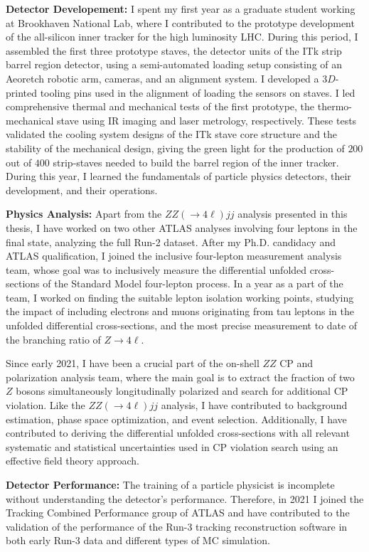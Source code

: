 \textbf{Detector Developement:}
I spent my first year as a graduate student working at Brookhaven National Lab, where I contributed to the prototype development of the all-silicon inner tracker for the high luminosity LHC. During this period, I assembled the first three prototype staves, the detector units of the ITk strip barrel region detector, using a semi-automated loading setup consisting of an Aeoretch robotic arm, cameras, and an alignment system. I developed a $3D$-printed tooling pins used in the alignment of loading the sensors on staves. I led comprehensive thermal and mechanical tests of the first prototype, the thermo-mechanical stave using IR imaging and laser metrology, respectively. These tests validated the cooling system designs of the ITk stave core structure and the stability of the mechanical design, giving the green light for the production of $200$ out of $400$ strip-staves needed to build the barrel region of the inner tracker. During this year, I learned the fundamentals of particle physics detectors, their development, and their operations.  

\textbf{Physics Analysis:}
Apart from the $ZZ(\rightarrow 4\ell)jj$ analysis presented in this thesis, I have worked on two other ATLAS analyses involving four leptons in the final state, analyzing the full Run-2 dataset. After my Ph.D. candidacy and ATLAS qualification, I joined the inclusive four-lepton measurement analysis team, whose goal was to inclusively measure the differential unfolded cross-sections of the Standard Model four-lepton process. In a year as a part of the team, I worked on finding the suitable lepton isolation working points, studying the impact of including electrons and muons originating from tau leptons in the unfolded differential cross-sections, and the most precise measurement to date of the branching ratio of $ Z \to 4\ell$.

Since early 2021, I have been a crucial part of the on-shell $ZZ$ CP and polarization analysis team, where the main goal is to extract the fraction of two $Z$ bosons simultaneously longitudinally polarized and search for additional CP violation. Like the $ZZ(\rightarrow 4\ell)jj$ analysis, I have contributed to background estimation, phase space optimization, and event selection. Additionally, I have contributed to deriving the differential unfolded cross-sections with all relevant systematic and statistical uncertainties used in CP violation search using an effective field theory approach. 

\textbf{Detector Performance: }
The training of a particle physicist is incomplete without understanding the detector's performance. Therefore, in 2021 I joined the Tracking Combined Performance group of ATLAS and have contributed to the validation of the performance of the Run-3 tracking reconstruction software in both early Run-3 data and different types of MC simulation. 

